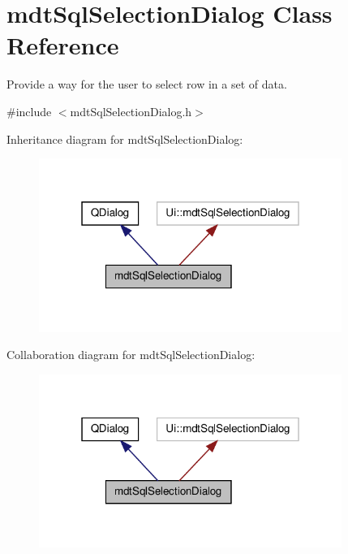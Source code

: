 \hypertarget{classmdt_sql_selection_dialog}{\section{mdt\-Sql\-Selection\-Dialog Class Reference}
\label{classmdt_sql_selection_dialog}
}


Provide a way for the user to select row in a set of data.  




{\ttfamily \#include $<$mdt\-Sql\-Selection\-Dialog.\-h$>$}



Inheritance diagram for mdt\-Sql\-Selection\-Dialog\-:
\nopagebreak
\begin{figure}[H]
\begin{center}
\leavevmode
\includegraphics[width=280pt]{classmdt_sql_selection_dialog__inherit__graph}
\end{center}
\end{figure}


Collaboration diagram for mdt\-Sql\-Selection\-Dialog\-:
\nopagebreak
\begin{figure}[H]
\begin{center}
\leavevmode
\includegraphics[width=280pt]{classmdt_sql_selection_dialog__coll__graph}
\end{center}
\end{figure}
